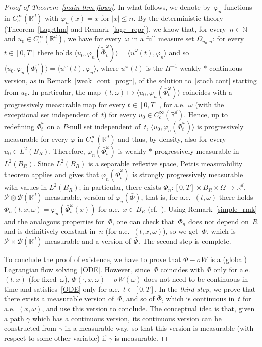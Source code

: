 \documentclass[a4paper,10pt]{article}
\newcommand\1{\mathbbm{1}}
\newcommand{\mc}{\mathcal}
\newcommand{\lan}{\langle}
\newcommand{\ran}{\rangle}
\newcommand{\td}{\tilde}
\numberwithin{equation}{section}
\begin{document}
\begin{proof}[Proof of Theorem~\ref{main thm flows}]
In what follows, we denote by~$\varphi_n$ functions in $C^\infty_c(\mathbb{R}^d)$ with $\varphi_n(x)=x$ for $|x|\le n$. By the deterministic theory (Theorem~\ref{Lagrthm} and Remark~\ref{lagr_repr}), we know that, for every~$n \in \mathbb{N}$ and $u_0 \in C^\infty_c(\mathbb{R}^d)$, we have for every~$\omega$ in a full measure set $\Omega_{u_0,n}$: for every~$t \in [0,T]$ there holds $\lan u_0,\varphi_n(\td{\bar{\Phi}}_t^\omega)\ran = \lan \td{u}^\omega(t),\varphi_n\ran$ and so $\lan u_0,\varphi_n(\bar{\Phi}_t^\omega)\ran = \lan u^\omega(t),\varphi_n\ran$, where $u^\omega(t)$ is the $H^{-1}$-weakly-$*$ continuous version, as in Remark~\ref{weak_cont_progr}, of the solution to~\eqref{stoch cont} starting from $u_0$. In particular, the map $(t,\omega)\mapsto \lan u_0,\varphi_n(\bar{\Phi}_t^\omega)\ran$ coincides with a progressively measurable map for every $t \in [0,T]$, for a.e.~$\omega$ (with the exceptional set independent of~$t$) for every $u_0 \in C^\infty_c(\mathbb{R}^d)$. Hence, up to redefining $\bar{\Phi}_t^\omega$ on a $P$-null set independent of~$t$, $\lan u_0,\varphi_n(\bar{\Phi}_t^\omega)\ran$ is progressively measurable for every $\varphi$ in $C^\infty_c(\mathbb{R}^d)$ and thus, by density, also for every $u_0 \in L^2(B_R)$. Therefore, $\varphi_n(\bar{\Phi}_t^\omega)$ is weakly-$*$ progressively measurable in $L^2(B_R)$. Since $L^2(B_R)$ is a separable reflexive space, Pettis measurability theorem applies and gives that $\varphi_n(\bar{\Phi}_t^\omega)$ is strongly progressively measurable with values in $L^2(B_R)$; in particular, there exists $\Phi_n \colon [0,T]\times B_R\times \Omega\rightarrow\mathbb{R}^d$, $\mc{P}\otimes\mc{B}(\mathbb{R}^d)$-measurable, version of $\varphi_n(\bar{\Phi})$, that is, for a.e.~$(t,\omega)$ there holds $\Phi_n(t,x,\omega)=\varphi_n(\bar{\Phi}_t^\omega(x))$ for a.e.~$x\in B_R$ (cf.~\cite[Proposition~A.6]{MAURELLIPHD}). Using Remark~\ref{simple_rmk} and the analogous properties for~$\bar{\Phi}$, one can check that~$\Phi_n$ does not depend on~$R$ and is definitively constant in~$n$ (for a.e.~$(t,x,\omega)$), so we get~$\Phi$, which is $\mc{P}\times\mc{B}(\mathbb{R}^d)$-measurable and a version of $\bar{\Phi}$. The second step is complete.

To conclude the proof of existence, we have to prove that $\Phi -\sigma W$ is a (global) Lagrangian flow solving~\eqref{ODE}. However, since~$\Phi$ coincides with $\bar{\Phi}$ only for a.e. $(t,x)$ (for fixed~$\omega$), $\Phi(\cdot,x,\omega) -\sigma W(\omega)$ does not need to be continuous in time and satisfies~\eqref{ODE} only for a.e.~$t \in [0,T]$. In the \emph{third step}, we prove that there exists a measurable version of~$\Phi$, and so of $\bar{\Phi}$, which is continuous in~$t$ for a.e.~$(x,\omega)$, and use this version to conclude. The conceptual idea is that, given a path $\gamma$ which has a continuous version, its continuous version can be constructed from $\gamma$ in a measurable way, so that this version is measurable (with respect to some other variable) if $\gamma$ is measurable.


\end{proof}
\end{document}
